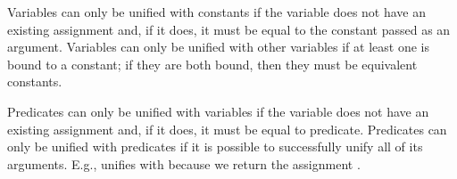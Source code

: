 Variables can only be unified with constants if the variable does not have an existing assignment and, if it does, it must be equal to the constant passed as an argument. Variables can only be unified with other variables if at least one is bound to a constant; if they are both bound, then they must be equivalent constants. 

Predicates can only be unified with variables if the variable does not have an existing assignment and, if it does, it must be equal to  predicate. Predicates can only be unified with predicates if it is possible to successfully unify all of its arguments. E.g.,  unifies with  because we return the assignment . 


